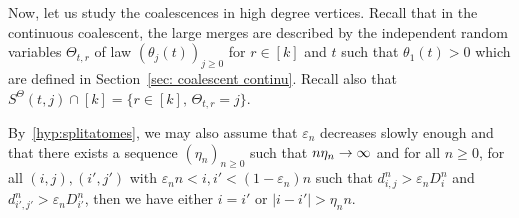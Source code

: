 \documentclass[10pt]{amsart}
\theoremstyle{definition}\newtheorem{defi}[theo]{Definition}\newtheorem{rema}[theo]{Remark}\newtheorem{exam}[theo]{Example}\newtheorem{exem}[theo]{Example}\newtheorem{nota}[theo]{Notation}
\newcommand{\e}{\varepsilon}
\newcommand{\1}{\mathbbm{1}}
\renewcommand*{\to}{\mathchoice{\longrightarrow}{\rightarrow}{\rightarrow}{\rightarrow}}
\begin{document}
Now, let us study the coalescences in high degree vertices. Recall that in the continuous coalescent, the large merges are described by the independent random variables $\Theta_{t,r}$ of law $(\theta_j(t))_{j\ge 0}$ for $r \in [k]$ and $t$ such that $\theta_1(t)>0$ which are defined in Section~\ref{sec: coalescent continu}. Recall also that $S^\Theta(t,j)\cap [k]= \{ r \in [k], \, \Theta_{t,r} = j\} $.

By~\ref{hyp:splitatomes}, we may also assume that $\e_n$ decreases slowly enough and that there exists a sequence $(\eta_n)_{n \ge 0}$ such that $n \eta_n \to \infty$ and for all $n \ge 0$, for all $(i,j),(i',j')$ with $\e_n n < i,i' < (1-\e_n) n$ such that $d^n_{i,j} > \e_n D^n_i$ and $d^n_{i',j'} > \e_n D^n_{i'}$, then we have either $i=i'$ or $| i-i' | > \eta_n n$.
\end{document}
